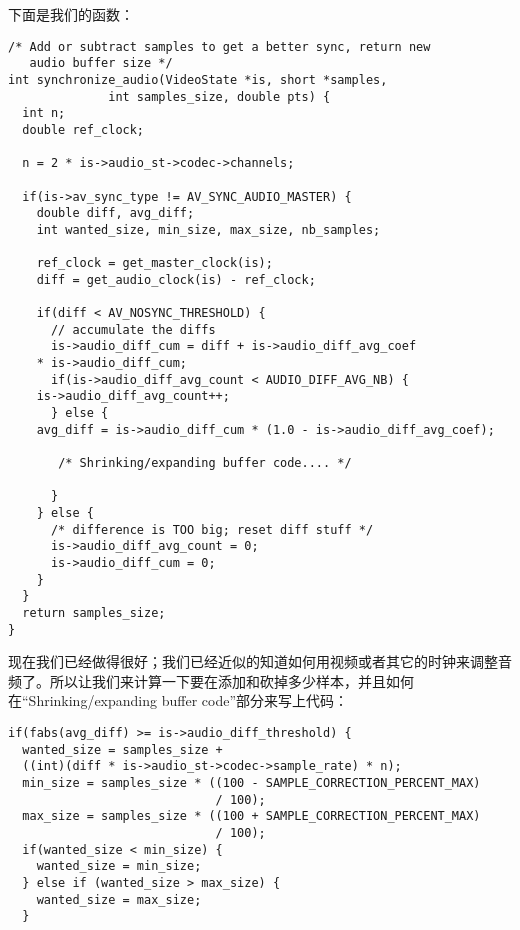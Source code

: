 
下面是我们的函数：
\begin{lstlisting}
/* Add or subtract samples to get a better sync, return new
   audio buffer size */
int synchronize_audio(VideoState *is, short *samples,
              int samples_size, double pts) {
  int n;
  double ref_clock;

  n = 2 * is->audio_st->codec->channels;

  if(is->av_sync_type != AV_SYNC_AUDIO_MASTER) {
    double diff, avg_diff;
    int wanted_size, min_size, max_size, nb_samples;

    ref_clock = get_master_clock(is);
    diff = get_audio_clock(is) - ref_clock;

    if(diff < AV_NOSYNC_THRESHOLD) {
      // accumulate the diffs
      is->audio_diff_cum = diff + is->audio_diff_avg_coef
    * is->audio_diff_cum;
      if(is->audio_diff_avg_count < AUDIO_DIFF_AVG_NB) {
    is->audio_diff_avg_count++;
      } else {
    avg_diff = is->audio_diff_cum * (1.0 - is->audio_diff_avg_coef);

       /* Shrinking/expanding buffer code.... */

      }
    } else {
      /* difference is TOO big; reset diff stuff */
      is->audio_diff_avg_count = 0;
      is->audio_diff_cum = 0;
    }
  }
  return samples_size;
}
\end{lstlisting}

现在我们已经做得很好；我们已经近似的知道如何用视频或者其它的时钟来调整音频了。所以让我们来计算一下要在添加和砍掉多少样本，并且如何在“Shrinking/expanding buffer code”部分来写上代码：

\begin{lstlisting}
if(fabs(avg_diff) >= is->audio_diff_threshold) {
  wanted_size = samples_size +
  ((int)(diff * is->audio_st->codec->sample_rate) * n);
  min_size = samples_size * ((100 - SAMPLE_CORRECTION_PERCENT_MAX)
                             / 100);
  max_size = samples_size * ((100 + SAMPLE_CORRECTION_PERCENT_MAX)
                             / 100);
  if(wanted_size < min_size) {
    wanted_size = min_size;
  } else if (wanted_size > max_size) {
    wanted_size = max_size;
  }
\end{lstlisting}

